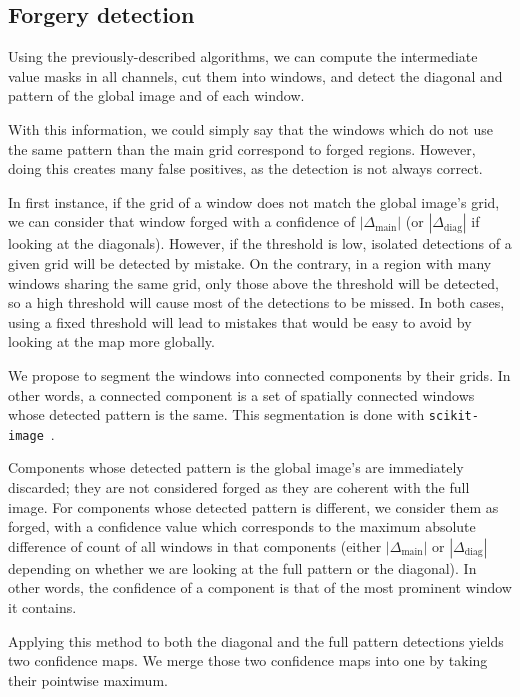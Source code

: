 \documentclass{ipol}
\begin{document}
\subsection{Forgery detection}
Using the previously-described algorithms, we can compute the intermediate value masks in all channels, cut them into windows, and detect the diagonal and pattern of the global image and of each window.

With this information, we could simply say that the windows which do not use the same pattern than the main grid correspond to forged regions. However, doing this creates many false positives, as the detection is not always correct.


In first instance, if the grid of a window does not match the global image's grid, we can consider that window forged with a confidence of $|\Delta_{\mathrm{main}}|$ (or $|\Delta_{\mathrm{diag}}|$ if looking at the diagonals). However, if the threshold is low, isolated detections of a given grid will be detected by mistake. On the contrary, in a region with many windows sharing the same grid, only those above the threshold will be detected, so a high threshold will cause most of the detections to be missed. In both cases, using a fixed threshold will lead to mistakes that would be easy to avoid by looking at the map more globally.

We propose to segment the windows into connected components by their grids. In other words, a connected component is a set of spatially connected windows whose detected pattern is the same.
This segmentation is done with \texttt{scikit-image}~\cite{skimage}.

Components whose detected pattern is the global image's are immediately discarded; they are not considered forged as they are coherent with the full image.
For components whose detected pattern is different, we consider them as forged, with a confidence value which corresponds to the maximum absolute difference of count of all windows in that components (either $|\Delta_{\mathrm{main}}|$ or $|\Delta_{\mathrm{diag}}|$ depending on whether we are looking at the full pattern or the diagonal). In other words, the confidence of a component is that of the most prominent window it contains.

Applying this method to both the diagonal and the full pattern detections yields two confidence maps. We merge those two confidence maps into one by taking their pointwise maximum.
\end{document}
